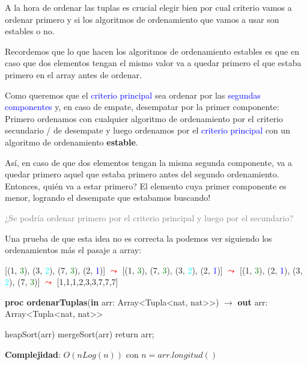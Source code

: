 \documentclass{article}
\newcommand{\curly}{\mathrel{\leadsto}}
\newcommand{\Complexity}[1]{\textbf{Complejidad}: #1}
\newcommand{\meta}[1]{\textcolor{gray}{#1}}
\begin{document}
A la hora de ordenar las tuplas es crucial elegir bien por cual criterio vamos a ordenar primero y si los algoritmos de ordenamiento que vamos a usar son estables o no.


Recordemos que lo que hacen los algoritmos de ordenamiento estables es que en caso que dos elementos tengan el mismo valor va a quedar primero el que estaba primero en el array antes de ordenar.

Como queremos que el \textcolor{blue}{criterio principal} sea ordenar por las \textcolor{blue}{segundas componentes} y, en \textcolor{violetDark}{caso de empate}, desempatar por la \textcolor{violetDark}{primer componente}: Primero ordenamos con cualquier algoritmo de ordenamiento por el \textcolor{violetDark}{criterio secundario / de desempate} y luego ordenamos por el \textcolor{blue}{criterio principal} con un algoritmo de ordenamiento \textbf{estable}. 

Así, en caso de que \textcolor{violetDark}{dos elementos tengan la misma segunda componente}, va a quedar primero aquel que estaba primero antes del segundo ordenamiento. Entonces, quién va a estar primero? El elemento cuya \textcolor{violetDark}{primer componente es menor}, logrando el \textcolor{violetDark}{desempate} que estabamos buscando!

\meta{¿Se podría ordenar primero por el criterio principal y luego por el secundario?}

Una prueba de que esta idea no es correcta la podemos ver siguiendo los ordenamientos más el pasaje a array:

[(1, \textcolor{green}{3}), (3, \textcolor{cyan}{2}), (7, \textcolor{green}{3}), (2, \textcolor{blue}{1})] \textcolor{red}{$\curly$} [(1, \textcolor{green}{3}), (7, \textcolor{green}{3}), (3, \textcolor{cyan}{2}), (2, \textcolor{blue}{1})] \textcolor{red}{$\curly$} [(1, \textcolor{green}{3}), (2, \textcolor{blue}{1}), (3, \textcolor{cyan}{2}), (7, \textcolor{green}{3})] \textcolor{red}{$\curly$} [1,1,1,2,3,3,7,7,7] \textcolor{red}{}

\vspace{-0.5em}
\begin{algorithm}[H]
    \caption{
        \textbf{proc ordenarTuplas}(\textbf{in} arr: \textnormal{Array\textless{}Tupla\textless{}nat, nat\textgreater{}\textgreater{}}) $\to$ \textbf{out} arr: \textnormal{Array\textless{}Tupla\textless{}nat, nat\textgreater{}\textgreater{}}
    }
    \begin{algorithmic}[1]
        \State heapSort(arr) 
        \State mergeSort(arr) 
        \State return arr;
    \end{algorithmic}
    \Complexity{$O(nLog(n)) \text{ con } n = arr.longitud()$}
\end{algorithm}
\vspace{-1.2em}
\end{document}
